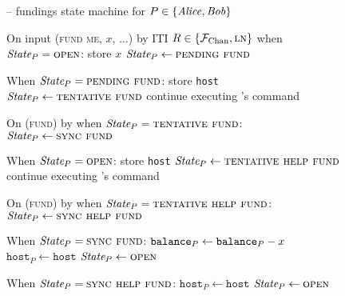 \begin{figure}[H]
  \begin{systembox}{\fchan{} -- fundings state machine for $P \in \{\mathit{Alice},
  \mathit{Bob}\}$}
    \begin{algorithmic}[1]
      \State On input (\textsc{fund me}, $x$, $\dots$) by ITI $R \in \{\mathcal{F}_{\mathrm{Chan}},
      \textsc{ln}\}$ when $\itistate_P = \textsc{open}$:
      \label{code:functionality:state-machine:when-fund}
      \Indent
        \State store $x$
        \State $\itistate_P \gets \textsc{pending fund}$
      \EndIndent
      \Statex

      \State When $\itistate_P = \textsc{pending fund}$:
      \Indent
          \State store \texttt{host}
          \State $\itistate_P \gets \textsc{tentative fund}$
          \State continue executing \adversary's command
        \EndIf
      \EndIndent
      \Statex

      \State On (\textsc{fund}) by \adversary when $\itistate_P =
      \textsc{tentative fund}$:
      \Indent
        \State $\itistate_P \gets \textsc{sync fund}$
      \EndIndent
      \Statex

      \State When $\itistate_P = \textsc{open}$:
      \Indent
          \State store \texttt{host}
          \State $\itistate_P \gets \textsc{tentative help fund}$
          \State continue executing \adversary's command
        \EndIf
      \EndIndent
      \Statex

      \State On (\textsc{fund}) by \adversary when $\itistate_P =
      \textsc{tentative help fund}$:
      \Indent
        \State $\itistate_P \gets \textsc{sync help fund}$
      \EndIndent
      \Statex

      \State When $\itistate_P = \textsc{sync fund}$:
      \Indent
          \State $\texttt{balance}_{P} \gets \texttt{balance}_{P} - x$
          \State $\texttt{host}_P \gets \texttt{host}$
          \State {}
          \State $\itistate_P \gets \textsc{open}$
          \label{code:functionality:fund:fund-end}
        \EndIf
      \EndIndent
      \Statex

      \State When $\itistate_P = \textsc{sync help fund}$:
      \Indent
          \State $\texttt{host}_P \gets \texttt{host}$
          \State {}
          \State $\itistate_P \gets \textsc{open}$
          \label{code:functionality:fund:help-fund-end}
        \EndIf
      \EndIndent
    \end{algorithmic}
  \end{systembox}
  \caption{}
  \label{code:functionality:fund}
\end{figure}
